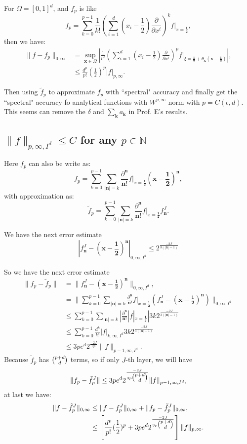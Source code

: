 For $\Omega = [0,1]^d$, and $f_p$ is like
$$
f_p = \sum_{k=0}^{p-1} \frac{1}{k!} \left(\sum_{i=1}^d (x_i - \frac{1}{2})\frac{\partial}{\partial x^i}\right)^k f |_{x = \frac{\bm 1}{\bm 2}},
$$
then we have:
\begin{align}
\|f - f_p\|_{0, \infty} &= \sup_{\bm x \in \Omega} \left|  \frac{1}{p!} \left(\sum_{i=1}^d (x_i - \frac{1}{2})\frac{\partial}{\partial x^i}\right)^p f |_{\xi = \frac{\bm 1}{\bm 2} + \theta_{\bm x}(\bm x - \frac{\bm 1}{\bm 2})} \right|, \\
&\le \frac{d^p}{p!} (\frac{1}{2})^p |f|_{p, \infty}.
\end{align}

Then using $\tilde f_p$ to approximate $f_p$ with ``spectral" accuracy and finally get the ``spectral" accuracy fo analytical functions with $W^{p, \infty}$ norm with $p = C(\epsilon, d)$. This seems can remove the $\delta$ and $\sum_{\bm k} a_{\bm k}$ in Prof. E's results.

\subsection{$\|f\|_{p, \infty, I^d} \le C$ for any $p \in \mathbb{N}$}
Here $f_p$ can also be write as:
$$
f_p = \sum_{k=0}^{p-1} \sum_{|\bm n| = k} \frac{\partial^{\bm n}}{\bm n !} f|_{x = \frac{\bm 1}{\bm 2}} (\bm x - \frac{\bm 1}{\bm 2})^{\bm n},
$$
with approximation as:
$$
\tilde f_p = \sum_{k=0}^{p-1} \sum_{|\bm n| = k} \frac{\partial^{\bm n}}{\bm n !} f|_{x = \frac{\bm 1}{\bm 2}}  f^J_{\bm n}.
$$

We have the next error estimate
$$
| f^J_{\bm n} - (\bm x - \frac{\bm 1}{\bm 2})^{\bm n} |_{0,\infty, I^d} \le 2^{\frac{-2J}{3(|\bm n|-1)}}
$$

So we have the next error estimate
\begin{align}
\|f_p - \tilde f_p\| &= \| f^J_{\bm n} - (\bm x - \frac{\bm 1}{\bm 2})^{\bm n} \|_{0,\infty, I^d}, \\
&= \|  \sum_{k=0}^{p-1} \sum_{|\bm n| = k} \frac{\partial^{\bm n}}{\bm n !} f|_{x = \frac{\bm 1}{\bm 2}} (f^J_{\bm n} - (\bm x - \frac{\bm 1}{\bm 2})^{\bm n})\|_{0, \infty,I^d} \\
&\le \sum_{k=0}^{p-1} \sum_{|\bm n| = k} | \frac{\partial^{\bm n}}{\bm n !} |f|_{x = \frac{\bm 1}{\bm 2}}| 3k2^{\frac{-2J}{3(|\bm n|-1)}}\\
&\le \sum_{k=0}^{p-1} \frac{d^k}{k!}|f|_{k,\infty,I^d} 3k2^{\frac{-2J}{3(|\bm n|-1)}} \\
&\le   3pe^d2^{\frac{-2J}{3p}} \|f\|_{p-1, \infty, I^d}.
\end{align}
Because $\tilde f_p$ has $\tbinom{p+d}{d}$ terms, so if only $J$-th layer, we will have
$$
\| f_p - \tilde f^J_p\| \le  3pe^d  2^{\frac{-2J}{3p\tbinom{p+d}{d}}}\|f\|_{p-1, \infty, I^d},
$$ 
at last we have:
\begin{align}
\|f- \tilde f^J_p\|_{0,\infty} &\le \|f - f^J_p\|_{0,\infty} + \|f_p - \tilde f^J_p\|_{0,\infty}, \\
&\le \left[  \frac{d^p}{p!} (\frac{1}{2})^p +3pe^d  2^{\frac{-2J}{3p\tbinom{p+d}{d}}}\right] \|f\|_{p, \infty}.
\end{align}

